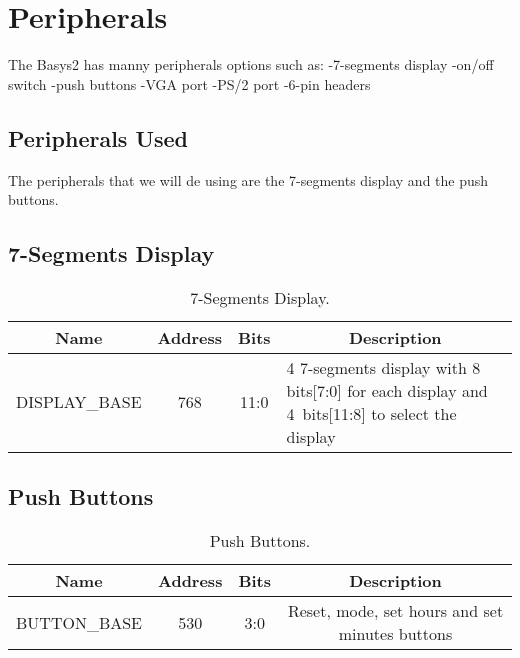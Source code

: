 \section{Peripherals}
\label{sec:periphs}

The Basys2 has manny peripherals options such as:
-7-segments display
-on/off switch
-push buttons
-VGA port
-PS/2 port
-6-pin headers

\subsection{Peripherals Used}

The peripherals that we will de using are the 7-segments display and the push buttons.


\subsection{7-Segments Display}

\begin{table}[h]
\centering
\caption{7-Segments Display.}
\sffamily
    \begin{tabular}{|c|c|c|p{10cm}|}
        \hline
        \multicolumn{1}{|c}{Name} & \multicolumn{1}{|c}{Address} & \multicolumn{1}{|c}{Bits} & \multicolumn{1}{|c|}{Description}\\ [0.5ex]
        \hline
        \hline
        DISPLAY\_BASE & 768 & 11:0 & 4 7-segments display with 8 bits[7:0] for each display and 4~bits[11:8] to select the display \\
        \hline
    \end{tabular}
\end{table}

\subsection{Push Buttons}

\begin{table}[h]
\centering
\caption{Push Buttons.}
\sffamily
    \begin{tabular}{|c|c|c|c|}
        \hline
        \textbf{Name} & \textbf{Address} & \textbf{Bits} & \textbf{Description} \\ [0.5ex]
        \hline
        \hline
        BUTTON\_BASE & 530 & 3:0 & Reset, mode, set hours and set minutes buttons\\
        \hline
    \end{tabular}
\end{table}

